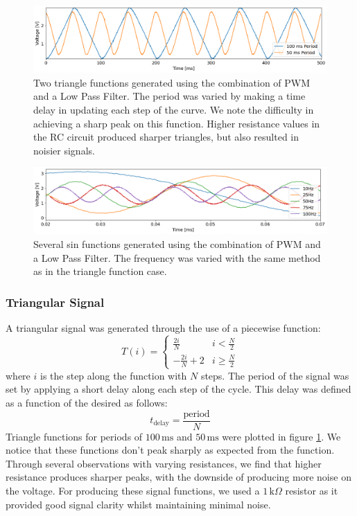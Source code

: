 \documentclass[%
 reprint,
 amsmath,amssymb,
 aps,
]{revtex4-2}
\begin{document}
    \begin{figure}
        \includegraphics[width=1.8\columnwidth]{Images/triangleFunc.png}
        \caption{\label{fig:triangle}Two triangle functions generated using the combination of PWM and a Low Pass Filter. The period was varied by making a time delay in updating each step of the curve. We note the difficulty in achieving a sharp peak on this function. Higher resistance values in the RC circuit produced sharper triangles, but also resulted in noisier signals.}
    \end{figure}
    \begin{figure}
        \includegraphics[width=1.8\columnwidth]{Images/sinFunc.png}
        \caption{\label{fig:sin}Several sin functions generated using the combination of PWM and a Low Pass Filter. The frequency was varied with the same method as in the triangle function case.}
    \end{figure}

        \subsubsection{Triangular Signal}

        A triangular signal was generated through the use of a piecewise function:
        \[T(i) = 
        \begin{cases}
            \frac{2i}{N} & i < \frac{N}{2}\\
            -\frac{2i}{N} + 2 & i \ge \frac{N}{2}
        \end{cases}
        \]
        where $i$ is the step along the function with $N$ steps. The period of the signal was set by applying a short delay along each step of the cycle. This delay was defined as a function of the desired as follows:
        \begin{equation}
            t_\text{delay} = \frac{\text{period}}{N}
        \end{equation}
        Triangle functions for periods of $100\,\text{ms}$ and $50\,\text{ms}$ were plotted in figure \ref{fig:triangle}. We notice that these functions don't peak sharply as expected from the function. Through several observations with varying resistances, we find that higher resistance produces sharper peaks, with the downside of producing more noise on the voltage. For producing these signal functions, we used a $1 \,\text{k}\Omega$ resistor as it provided good signal clarity whilst maintaining minimal noise.
\end{document}
